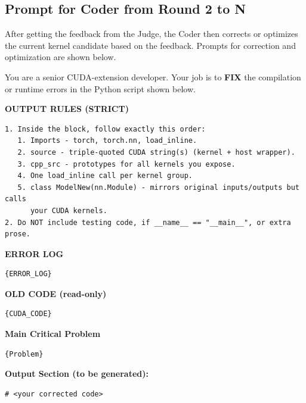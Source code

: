 \subsection{Prompt for Coder from Round 2 to N}
After getting the feedback from the Judge, the Coder then corrects or optimizes the current kernel candidate based on the feedback. Prompts for correction and optimization are shown below. 

\begin{tcolorbox}[redbox, title={Prompt for Kernel Correction}]
\ttfamily %

You are a senior CUDA-extension developer.  
Your job is to \textbf{FIX} the compilation or runtime errors in the Python script shown below.

\medskip
\textbf{OUTPUT RULES (STRICT)}
\begin{verbatim}
1. Inside the block, follow exactly this order:
   1. Imports - torch, torch.nn, load_inline.
   2. source - triple-quoted CUDA string(s) (kernel + host wrapper).
   3. cpp_src - prototypes for all kernels you expose.
   4. One load_inline call per kernel group.
   5. class ModelNew(nn.Module) - mirrors original inputs/outputs but calls
      your CUDA kernels.
2. Do NOT include testing code, if __name__ == "__main__", or extra prose.
\end{verbatim}

\medskip
\textbf{ERROR LOG}
\begin{tcolorbox}[colback=white, colframe=gray!50, left=2mm, right=2mm, top=1mm, bottom=1mm]
\footnotesize
\begin{verbatim}
{ERROR_LOG}
\end{verbatim}
\end{tcolorbox}

\textbf{OLD CODE (read-only)}
\begin{tcolorbox}[colback=white, colframe=gray!50, left=2mm, right=2mm, top=1mm, bottom=1mm]
\footnotesize
\begin{verbatim}
{CUDA_CODE}
\end{verbatim}
\end{tcolorbox}

\textbf{Main Critical Problem}
\begin{tcolorbox}[colback=white, colframe=gray!50, left=2mm, right=2mm, top=1mm, bottom=1mm]
\footnotesize
\begin{verbatim}
{Problem}
\end{verbatim}
\end{tcolorbox}

\medskip
\textbf{Output Section (to be generated):}
\begin{tcolorbox}[colback=white, colframe=gray!50, left=2mm, right=2mm, top=1mm, bottom=1mm]
\footnotesize
\begin{verbatim}
# <your corrected code>
\end{verbatim}
\end{tcolorbox}

\normalfont %
\end{tcolorbox}


